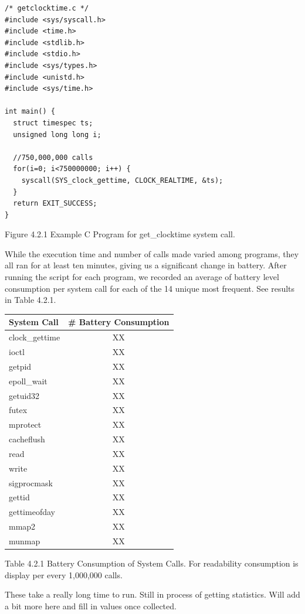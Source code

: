 \documentclass[11pt]{article}
\begin{document}
\begin{lstlisting}
/* getclocktime.c */
#include <sys/syscall.h>
#include <time.h>
#include <stdlib.h>
#include <stdio.h>
#include <sys/types.h>
#include <unistd.h>
#include <sys/time.h>

int main() {
  struct timespec ts;
  unsigned long long i;

  //750,000,000 calls
  for(i=0; i<750000000; i++) {
    syscall(SYS_clock_gettime, CLOCK_REALTIME, &ts);
  }
  return EXIT_SUCCESS;
}
\end{lstlisting}

{\fontsize{11}{13}\selectfont Figure 4.2.1 Example C Program for get\_clocktime system call.}
\newline

While the execution time and number of calls made varied among programs, they all ran for at least ten minutes, giving
us a significant change in battery. After running the script for each program, we recorded an average of battery level 
consumption per system call for each of the 14 unique most frequent.  See results in Table 4.2.1.

\begin{tabular}{l c}
   System Call & \# Battery Consumption \\
   \hline
   clock\_gettime & XX \\
   ioctl & XX \\
   getpid & XX \\
   epoll\_wait & XX \\
   getuid32 & XX \\
   futex & XX \\
   mprotect & XX \\
   cacheflush & XX \\
   read & XX \\
   write & XX \\
   sigprocmask & XX \\
   gettid & XX \\
   gettimeofday & XX \\
   mmap2 & XX \\
   munmap & XX \\ 
\end{tabular}
\newline
{\fontsize{11}{13}\selectfont Table 4.2.1 Battery Consumption of System Calls. For readability consumption is display
per every 1,000,000 calls.}
\newline

These take a really long time to run. Still in process of getting statistics. Will add a bit more here and fill in values once
collected.
\end{document}
